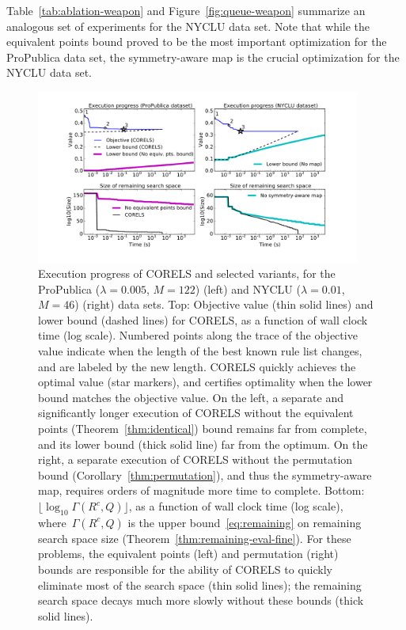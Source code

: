\documentclass[twoside,11pt]{article}
\def\Reg{{\lambda}}
\def\CurrentObj{{R^c}}
\def\Remaining{\Gamma}
\def\Queue{Q}
\begin{document}
Table~\ref{tab:ablation-weapon} and Figure~\ref{fig:queue-weapon} summarize an
analogous set of experiments for the NYCLU data set.
%
Note that while the equivalent points bound proved to be the most important optimization for the ProPublica data set,
the symmetry-aware map is the crucial optimization for the NYCLU data set.

\begin{figure}[t!]
\begin{center}
\includegraphics[trim={30mm, 20mm, 30mm, 20mm},
width=0.95\textwidth]{figs/weapon_execution_large-remaining-space.pdf}
\end{center}
\caption{Execution progress of CORELS and selected variants,
for the ProPublica (${\Reg = 0.005}$, ${M = 122}$) (left)
and NYCLU (${\Reg = 0.01}$, ${M = 46}$) (right) data sets.
%
Top: Objective value (thin solid lines) and lower bound (dashed lines) for CORELS,
as a function of wall clock time (log scale).
%
Numbered points along the trace of the objective value
indicate when the length of the best known rule list changes,
and are labeled by the new length.
%
CORELS quickly achieves the optimal value (star markers),
and certifies optimality when the lower bound matches the objective value.
%
On the left, a separate and significantly longer execution of CORELS
without the equivalent points  (Theorem~\ref{thm:identical}) bound remains
far from complete, and its lower bound (thick solid line) far from the optimum.
%
On the right, a separate execution of CORELS without the permutation bound
(Corollary~\ref{thm:permutation}), and thus the symmetry-aware map,
requires orders of magnitude more time to complete.
%
Bottom: $\lfloor \log_{10} \Remaining(\CurrentObj, \Queue) \rfloor$,
as a function of wall clock time (log scale),
where~$\Remaining(\CurrentObj, \Queue)$
is the upper bound~\eqref{eq:remaining} on remaining search space size
(Theorem~\ref{thm:remaining-eval-fine}).
%
For these problems, the equivalent points (left) and
permutation (right) bounds are responsible for the ability of
CORELS to quickly eliminate most of the search space (thin solid lines);
the remaining search space decays much more slowly without these bounds (thick solid lines).
}
\label{fig:objective}
\end{figure}
\end{document}

